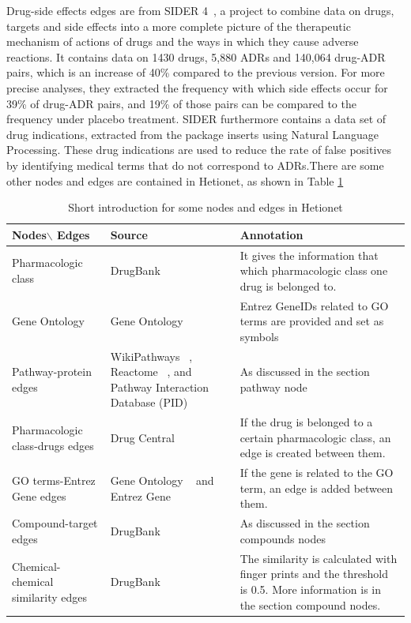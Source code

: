 Drug-side effects edges are from SIDER 4~\cite{kuhn_sider_2016}, a project to combine data on drugs, targets and side effects into a more complete picture of the therapeutic mechanism of actions of drugs and the ways in which they cause adverse reactions. It contains data on 1430 drugs, 5,880 \ac{ADR}s and 140,064 drug-\ac{ADR} pairs, which is an increase of 40\% compared to the previous version. For more precise analyses, they extracted the frequency with which side effects occur for 39\% of drug-\ac{ADR} pairs, and 19\% of those pairs can be compared to the frequency under placebo treatment. \ac{SIDER} furthermore contains a data set of drug indications, extracted from the package inserts using Natural Language Processing. These drug indications are used to reduce the rate of false positives by identifying medical terms that do not correspond to \ac{ADR}s.There are some other nodes and edges are contained in Hetionet, as shown in Table \ref{tab:nodes_edges_hetio}

\begin{table}[!ht]
    \centering
    \begin{tabular}{|p{3cm}|p{5cm}|p{7cm}|}
        \hline
        \textbf{Nodes$\backslash$ Edges} & \textbf{Source} & \textbf{Annotation} \\
        \hline
        Pharmacologic class & DrugBank ~\cite{law_drugbank_2014} & It gives the information that which pharmacologic class one drug is belonged to. \\
        \hline
        Gene Ontology &Gene Ontology & Entrez GeneIDs related to GO terms are provided and set as symbols \\
        \hline
        Pathway-protein edges & WikiPathways ~\cite{kutmon_wikipathways:_2016}, Reactome ~\cite{croft_reactome:_2011}, and Pathway Interaction Database (PID) ~\cite{schaefer_pid:_2009} & As discussed in the section pathway node\\
        \hline
        Pharmacologic class-drugs edges & Drug Central & If the drug is belonged to a certain pharmacologic class, an edge is created between them. \\
        \hline
        GO terms-Entrez Gene edges & Gene Ontology ~\cite{the_gene_ontology_consortium_gene_2015} and Entrez Gene ~\cite{maglott_entrez_2011} & If the gene is related to the GO term, an edge is added between them. \\
        \hline
        Compound-target edges & DrugBank ~\cite{law_drugbank_2014} & As discussed in the section compounds nodes \\
        \hline
        Chemical-chemical similarity edges & DrugBank ~\cite{law_drugbank_2014} & 
The similarity is calculated with finger prints and the threshold is 0.5. More information is in the section compound nodes. \\
        \hline
    \end{tabular}
    \captionsetup{justification=centering}
    \caption{Short introduction for some nodes and edges in Hetionet}
    \label{tab:nodes_edges_hetio}
\end{table}

